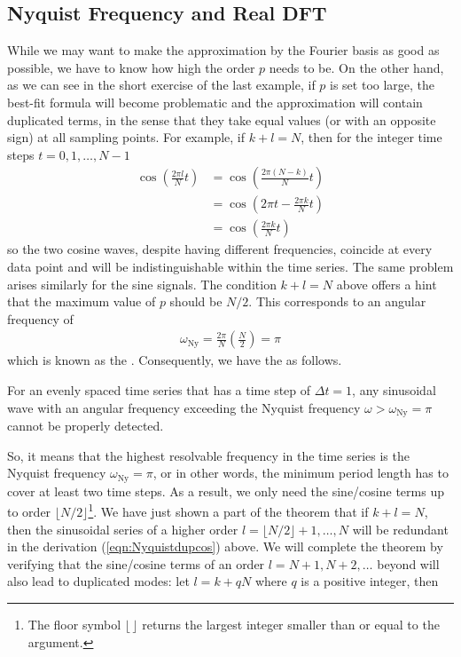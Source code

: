 \subsection{Nyquist Frequency and Real DFT}

While we may want to make the approximation by the Fourier basis as good as possible, we have to know how high the order $p$ needs to be. On the other hand, as we can see in the short exercise of the last example, if $p$ is set too large, the best-fit formula will become problematic and the approximation will contain duplicated terms, in the sense that they take equal values (or with an opposite sign) at all sampling points. For example, if $k + l = N$, then for the integer time steps $t = 0, 1, \ldots, N-1$
\begin{align}
\cos(\frac{2\pi l}{N} t) &= \cos(\frac{2\pi (N-k)}{N} t) \nonumber \\
&= \cos(2\pi t - \frac{2\pi k}{N} t) \nonumber \\
&= \cos(\frac{2\pi k}{N} t) \label{eqn:Nyquistdupcos}
\end{align}
so the two cosine waves, despite having different frequencies, coincide at every data point and will be indistinguishable within the time series. The same problem arises similarly for the sine signals. The condition $k + l = N$ above offers a hint that the maximum value of $p$ should be $N/2$. This corresponds to an angular frequency of 
\begin{align}
\omega_{\text{Ny}} = \frac{2\pi}{N}\left(\frac{N}{2}\right) = \pi    
\end{align}
which is known as the . Consequently, we have the  as follows.
\begin{thm}
\label{thm:Nyquist}
For an evenly spaced time series that has a time step of $\Delta t = 1$, any sinusoidal wave with an angular frequency exceeding the Nyquist frequency $\omega > \omega_{\text{Ny}} = \pi$ cannot be properly detected. 
\end{thm}
So, it means that the highest resolvable frequency in the time series is the Nyquist frequency $\omega_{\text{Ny}} = \pi$, or in other words, the minimum period length has to cover at least two time steps. As a result, we only need the sine/cosine terms up to order $\lfloor N/2 \rfloor$\footnote{The floor symbol $\lfloor \, \rfloor$ returns the largest integer smaller than or equal to the argument.}. We have just shown a part of the theorem that if $k + l = N$, then the sinusoidal series of a higher order $l = \lfloor N/2 \rfloor + 1, \ldots, N$ will be redundant in the derivation (\ref{eqn:Nyquistdupcos}) above. We will complete the theorem by verifying that the sine/cosine terms of an order $l = N+1, N+2, \ldots$ beyond will also lead to duplicated modes: let $l = k + qN$ where $q$ is a positive integer, then
